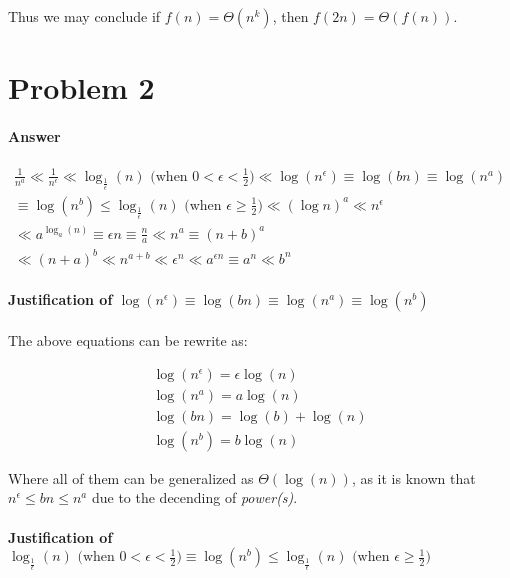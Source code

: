 \documentclass[12pt]{article}
\begin{document}
Thus we may conclude if $f(n) = \Theta(n^k)$, then $f(2n) = \Theta(f(n))$.

\section{Problem 2}

\paragraph{Answer}

\begin{gather}
    \frac{1}{n^a} \ll \frac{1}{n^\epsilon} \ll \log_{\frac{1}{\epsilon}}(n) \text{ \ (when $0 < \epsilon < \frac{1}{2}$)} \ll \log(n^\epsilon) \equiv \log(bn) \equiv \log(n^a) \\
    \equiv \log(n^b) \leq \log_{\frac{1}{\epsilon}}(n) \text{ \ (when $\epsilon \geq \frac{1}{2}$)} \ll (\log n)^a \ll n^{\epsilon} \\
    \ll a^{\log_a(n)} \equiv \epsilon n \equiv \frac{n}{a} \ll n^a \equiv (n+b)^a\\
    \ll (n+a)^b \ll n^{a+b} \ll \epsilon^n \ll a^{\epsilon n} \equiv a^n \ll b^n
\end{gather}


\paragraph{Justification of $\log(n^\epsilon) \equiv \log(bn) \equiv \log(n^a) \equiv \log(n^b)$\newline}

The above equations can be rewrite as:

\begin{gather}
    \log(n^\epsilon) = \epsilon \log(n) \\
    \log(n^a) = a \log(n) \\
    \log(bn) = \log(b) + \log(n) \\
    \log(n^b) = b \log(n)
\end{gather}

Where all of them can be generalized as $\Theta(\log(n))$, as it is known that $n^\epsilon \leq bn \leq n^a$ due to the decending of \textit{power(s)}.

\paragraph{Justification of $ \log_{\frac{1}{\epsilon}}(n) \text{ \ (when $0 < \epsilon < \frac{1}{2}$)} \equiv \log(n^b) \leq \log_{\frac{1}{\epsilon}}(n) \text{ \ (when $\epsilon \geq \frac{1}{2}$)}$\newline}
\end{document}
